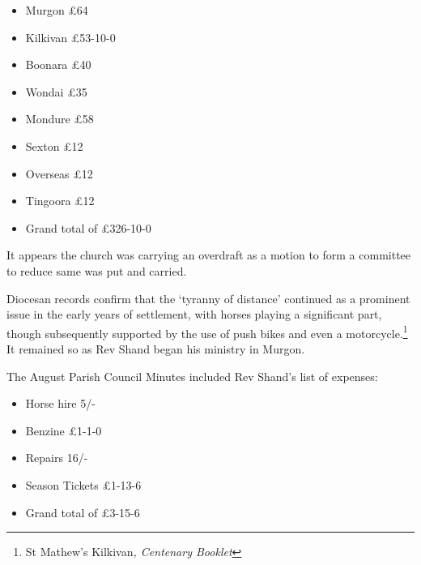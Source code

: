 \begin{itemize}

\item

  Murgon \pounds64

\item

  Kilkivan \pounds53-10-0

\item

  Boonara \pounds40

\item

  Wondai \pounds35

\item

  Mondure \pounds58

\item

  Sexton \pounds12

\item

  Overseas \pounds12

\item

  Tingoora \pounds12

\item

  Grand total of \pounds326-10-0

\end{itemize}



\smallskip


It appears the church was carrying an overdraft as a motion to form a committee to reduce same was put and carried.



Diocesan records confirm that the `tyranny of distance' continued as a prominent issue in the early years of settlement, with horses playing a significant part, though subsequently supported by the use of push bikes and even a motorcycle.\footnote{St Mathew's Kilkivan\emph{, Centenary Booklet}} It remained so as Rev Shand began his ministry in Murgon.


The August Parish Council Minutes included Rev Shand's list of expenses:



\begin{itemize}

\item

  Horse hire 5/-

\item

  Benzine \pounds1-1-0

\item

  Repairs 16/-

\item

  Season Tickets \pounds1-13-6

\item

  Grand total of \pounds3-15-6

\end{itemize}



